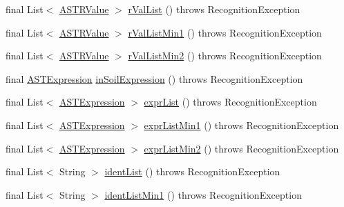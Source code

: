 \begin{DoxyCompactItemize}
\item 
final List$<$ \hyperlink{classorg_1_1tzi_1_1use_1_1parser_1_1soil_1_1ast_1_1_a_s_t_r_value}{A\-S\-T\-R\-Value} $>$ \hyperlink{classorg_1_1tzi_1_1use_1_1parser_1_1shell_1_1_shell_command_parser_a6320e09c491fdfe30335a3b49a5d9db8}{r\-Val\-List} ()  throws Recognition\-Exception 
\item 
final List$<$ \hyperlink{classorg_1_1tzi_1_1use_1_1parser_1_1soil_1_1ast_1_1_a_s_t_r_value}{A\-S\-T\-R\-Value} $>$ \hyperlink{classorg_1_1tzi_1_1use_1_1parser_1_1shell_1_1_shell_command_parser_a99414304b062f9e31e09337738c5bb1f}{r\-Val\-List\-Min1} ()  throws Recognition\-Exception 
\item 
final List$<$ \hyperlink{classorg_1_1tzi_1_1use_1_1parser_1_1soil_1_1ast_1_1_a_s_t_r_value}{A\-S\-T\-R\-Value} $>$ \hyperlink{classorg_1_1tzi_1_1use_1_1parser_1_1shell_1_1_shell_command_parser_a055d14c3aeff8a1c73d7f0d447de5d29}{r\-Val\-List\-Min2} ()  throws Recognition\-Exception 
\item 
final \hyperlink{classorg_1_1tzi_1_1use_1_1parser_1_1ocl_1_1_a_s_t_expression}{A\-S\-T\-Expression} \hyperlink{classorg_1_1tzi_1_1use_1_1parser_1_1shell_1_1_shell_command_parser_a3fe53f51be4d63f6a3e26af610f2759f}{in\-Soil\-Expression} ()  throws Recognition\-Exception 
\item 
final List$<$ \hyperlink{classorg_1_1tzi_1_1use_1_1parser_1_1ocl_1_1_a_s_t_expression}{A\-S\-T\-Expression} $>$ \hyperlink{classorg_1_1tzi_1_1use_1_1parser_1_1shell_1_1_shell_command_parser_ae3f73f2d0b42653a97f81171380acab8}{expr\-List} ()  throws Recognition\-Exception 
\item 
final List$<$ \hyperlink{classorg_1_1tzi_1_1use_1_1parser_1_1ocl_1_1_a_s_t_expression}{A\-S\-T\-Expression} $>$ \hyperlink{classorg_1_1tzi_1_1use_1_1parser_1_1shell_1_1_shell_command_parser_a5185629fbe3285e77511200fe9d1364f}{expr\-List\-Min1} ()  throws Recognition\-Exception 
\item 
final List$<$ \hyperlink{classorg_1_1tzi_1_1use_1_1parser_1_1ocl_1_1_a_s_t_expression}{A\-S\-T\-Expression} $>$ \hyperlink{classorg_1_1tzi_1_1use_1_1parser_1_1shell_1_1_shell_command_parser_afda11b7480cb0b2baa5360a10a0375c2}{expr\-List\-Min2} ()  throws Recognition\-Exception 
\item 
final List$<$ String $>$ \hyperlink{classorg_1_1tzi_1_1use_1_1parser_1_1shell_1_1_shell_command_parser_a2e0bcc9db8d824842de290f10ff11656}{ident\-List} ()  throws Recognition\-Exception 
\item 
final List$<$ String $>$ \hyperlink{classorg_1_1tzi_1_1use_1_1parser_1_1shell_1_1_shell_command_parser_a91cfdffe70707d284e061eba65b01418}{ident\-List\-Min1} ()  throws Recognition\-Exception 

\end{DoxyCompactItemize}
